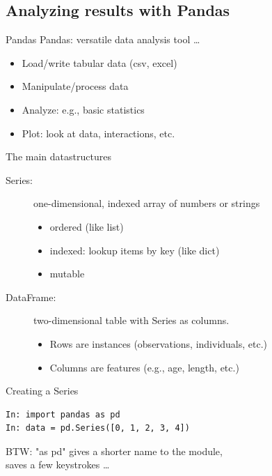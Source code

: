 \documentclass{beamer}
\begin{document}




\subsection{Analyzing results with Pandas}
\begin{frame}{Pandas}
    Pandas: versatile data analysis tool \dots

    \begin{itemize}
        \item Load/write tabular data (csv, excel)
        \item Manipulate/process data
        \item Analyze: e.g., basic statistics
        \item Plot: look at data, interactions, etc.
    \end{itemize}
\end{frame}

\begin{frame}{The main datastructures}
    \begin{description}
        \item[Series:] one-dimensional, indexed array of numbers or strings
            \begin{itemize}
                \item ordered (like list)
                \item indexed: lookup items by key (like dict)
                \item mutable
            \end{itemize}
        \item[DataFrame:] two-dimensional table with Series as columns.
            \begin{itemize}
                \item Rows are instances (observations, individuals, etc.)
                \item Columns are features (e.g., age, length, etc.)
            \end{itemize}
    \end{description}
\end{frame}

\begin{frame}[fragile]{Creating a Series}
\begin{lstlisting}
In: import pandas as pd
In: data = pd.Series([0, 1, 2, 3, 4])
\end{lstlisting}

\vspace{1em}
BTW: "as pd" gives a shorter name to the module, \\
saves a few keystrokes \dots
\end{frame}
\end{document}
